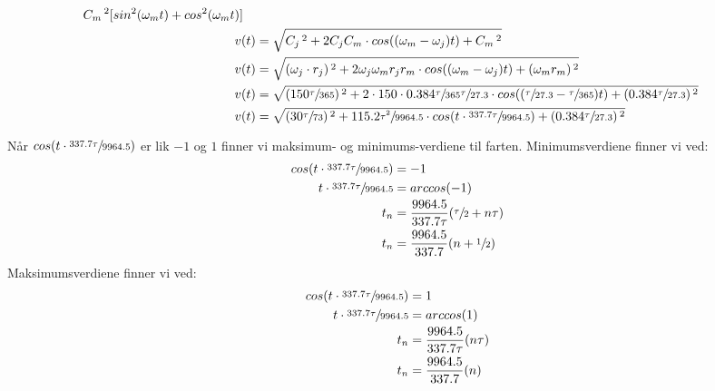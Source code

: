 \documentclass{../../myassignment}
\begin{document}
\begin{answer}
\begin{align}
{\begin{aligned}
					& C_m\,^2 [sin^2(\omega_m t) + cos^2(\omega_m t)]
				\end{aligned}
				}\\
				v(t) &= \sqrt{ C_j\,^2 + 2C_jC_m \cdot cos((\omega_m - \omega_j)t) + C_m\,^2 }\\
				v(t) &= \sqrt{ (\omega_j\cdot r_j)\,^2 + 2\omega_j\omega_m r_j r_m \cdot cos((\omega_m - \omega	_j)t) + (\omega_m r_m)\,^2 }\\
				v(t) &= \sqrt{ (150\sfrac{\tau}{365})\,^2 + 2\cdot150\cdot0.384\sfrac{\tau}{365}\sfrac{\tau}{27.3} \cdot cos((\sfrac{\tau}{27.3} - \sfrac{\tau}{365})t) + ( 0.384\sfrac{\tau}{27.3})\,^2 }\\
				v(t) &= \sqrt{ (30\sfrac{\tau}{73})\,^2 + 115.2\sfrac{\tau^2}{9964.5} \cdot cos(t\cdot \sfrac{337.7\tau}{9964.5}) + ( 0.384\sfrac{\tau}{27.3})\,^2 }
		\end{align}
	\end{answer}

	\begin{answer}
		N{\aa}r $cos(t\cdot \sfrac{337.7\tau}{9964.5})$ er lik $-1$ og $1$ finner vi maksimum- og minimums-verdiene til farten. 
		Minimumsverdiene finner vi ved:
			\begin{align}
			 	cos(t\cdot \sfrac{337.7\tau}{9964.5}) &= -1 \\
			 	t\cdot \sfrac{337.7\tau}{9964.5} &= arccos(-1) \\
			 	t_n &= \frac{9964.5}{337.7\tau} (\sfrac{\tau}{2}+n \tau)\\
			 	t_n &= \frac{9964.5}{337.7} (n + \sfrac{1}{2})
			 \end{align}
		Maksimumsverdiene finner vi ved:
			\begin{align}
			 	cos(t\cdot \sfrac{337.7\tau}{9964.5}) &= 1 \\
			 	t\cdot \sfrac{337.7\tau}{9964.5} &= arccos(1) \\
			 	t_n &= \frac{9964.5}{337.7\tau} (n \tau)\\
			 	t_n &= \frac{9964.5}{337.7} (n)
			 \end{align}
	\end{answer}
\end{document}
